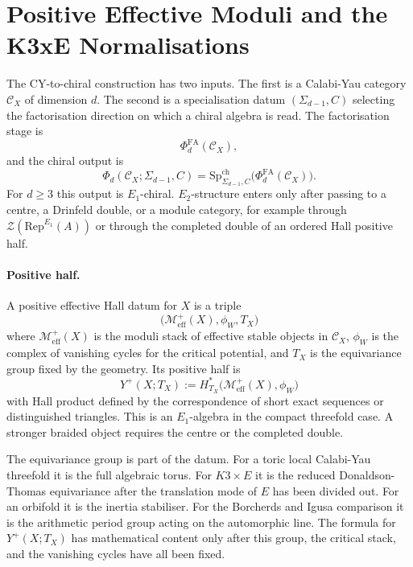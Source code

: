 \providecommand{\Phid}{\Phi_d}
\providecommand{\PhiFA}{\Phi^{\mathrm{FA}}}
\providecommand{\SpCh}{\mathrm{Sp}^{\mathrm{ch}}}
\providecommand{\CoHA}{\mathrm{CoHA}}
\providecommand{\Heq}{H^{*}_{\mathrm{eq}}}
\providecommand{\Meff}{\mathcal{M}^{+}_{\mathrm{eff}}}
\providecommand{\CY}{\mathrm{CY}}
\providecommand{\kcat}{\kappa_{\mathrm{cat}}}
\providecommand{\kch}{\kappa_{\mathrm{ch}}}
\providecommand{\kBKM}{\kappa_{\mathrm{BKM}}}
\providecommand{\kfib}{\kappa_{\mathrm{fiber}}}

\section*{Positive Effective Moduli and the K3xE Normalisations}

The CY-to-chiral construction has two inputs.  The first is a
Calabi-Yau category \(\mathcal C_X\) of dimension \(d\).  The second is
a specialisation datum \((\Sigma_{d-1},C)\) selecting the factorisation
direction on which a chiral algebra is read.  The factorisation stage is
\[
  \PhiFA_d(\mathcal C_X),
\]
and the chiral output is
\[
  \Phid(\mathcal C_X;\Sigma_{d-1},C)
  =
  \SpCh_{\Sigma_{d-1},C}\bigl(\PhiFA_d(\mathcal C_X)\bigr).
\]
For \(d\geq 3\) this output is \(E_1\)-chiral.  \(E_2\)-structure enters
only after passing to a centre, a Drinfeld double, or a module category,
for example through
\(\mathcal Z(\mathrm{Rep}^{E_1}(A))\) or through the completed double
of an ordered Hall positive half.

\paragraph{Positive half.}
A positive effective Hall datum for \(X\) is a triple
\[
  \bigl(\Meff(X),\phi_W,T_X\bigr)
\]
where \(\Meff(X)\) is the moduli stack of effective stable objects in
\(\mathcal C_X\), \(\phi_W\) is the complex of vanishing cycles for the
critical potential, and \(T_X\) is the equivariance group fixed by the
geometry.  Its positive half is
\[
  Y^+(X;T_X)
  :=
  H^*_{T_X}\bigl(\Meff(X),\phi_W\bigr)
\]
with Hall product defined by the correspondence of short exact
sequences or distinguished triangles.  This is an \(E_1\)-algebra in
the compact threefold case.  A stronger braided object requires the
centre or the completed double.

The equivariance group is part of the datum.  For a toric local
Calabi-Yau threefold it is the full algebraic torus.  For
\(K3\times E\) it is the reduced Donaldson-Thomas equivariance after the
translation mode of \(E\) has been divided out.  For an orbifold it is
the inertia stabiliser.  For the Borcherds and Igusa comparison it is
the arithmetic period group acting on the automorphic line.  The formula
for \(Y^+(X;T_X)\) has mathematical content only after this group, the
critical stack, and the vanishing cycles have all been fixed.

